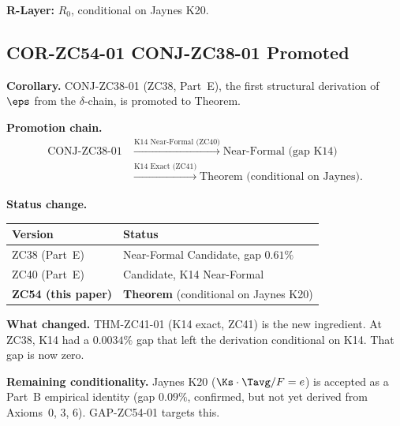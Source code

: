 \documentclass[12pt, a4paper]{article}
\begin{document}
\begin{formalbox}[title={THM-ZC54-01: Wald Self-Consistency
  Theorem ($R_0$, Conditional on Jaynes K20)}]
\textbf{R-Layer:} $R_0$, conditional on Jaynes K20.
\end{formalbox}

\subsection{COR-ZC54-01 \quad CONJ-ZC38-01 Promoted}
\label{zc54:sec:cor01}


\begin{formalbox}[title={COR-ZC54-01: CONJ-ZC38-01 Promoted
  to Theorem (Conditional on Jaynes K20)}]
\textbf{Corollary.}
CONJ-ZC38-01 (ZC38, Part~E), the first structural derivation
of $\eps$ from the $\delta$-chain, is promoted to Theorem.

\textbf{Promotion chain.}
\begin{align*}
  \text{CONJ-ZC38-01} &\;\xrightarrow{\text{K14 Near-Formal (ZC40)}}\;
    \text{Near-Formal (gap K14)} \\
  &\;\xrightarrow{\text{K14 Exact (ZC41)}}\;
    \text{Theorem (conditional on Jaynes).}
\end{align*}

\textbf{Status change.}
\begin{center}
\begin{tabular}{@{}ll@{}}
\toprule
Version & Status \\
\midrule
ZC38 (Part~E) & Near-Formal Candidate, gap $0.61\%$ \\
ZC40 (Part~E) & Candidate, K14 Near-Formal \\
\textbf{ZC54 (this paper)} &
  \textbf{Theorem} (conditional on Jaynes K20) \\
\bottomrule
\end{tabular}
\end{center}

\textbf{What changed.} THM-ZC41-01 (K14 exact, ZC41) is the
new ingredient. At ZC38, K14 had a $0.0034\%$ gap that left
the derivation conditional on K14. That gap is now zero.

\textbf{Remaining conditionality.} Jaynes K20
($\Ks\cdot\Tavg/F = e$) is accepted as a Part~B
empirical identity (gap $0.09\%$, confirmed, but not yet
derived from Axioms~0, 3, 6). GAP-ZC54-01 targets this.
\end{formalbox}
\end{document}
